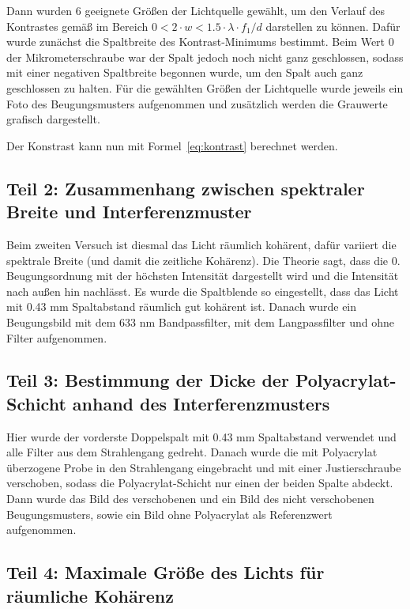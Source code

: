\documentclass{article}
\begin{document}
Dann wurden 6 geeignete Größen der Lichtquelle gewählt, um den Verlauf des Kontrastes gemäß im Bereich $0 < 2\cdot w < 1.5 \cdot \lambda\cdot f_1 / d$ darstellen zu können. Dafür wurde zunächst die Spaltbreite des Kontrast-Minimums bestimmt. Beim Wert 0 der Mikrometerschraube war der Spalt jedoch noch nicht ganz geschlossen, sodass mit einer negativen Spaltbreite begonnen wurde, um den Spalt auch ganz geschlossen zu halten.
Für die gewählten Größen der Lichtquelle wurde jeweils ein Foto des Beugungsmusters aufgenommen und zusätzlich werden die Grauwerte grafisch dargestellt.

Der Konstrast kann nun mit Formel~\ref{eq:kontrast} berechnet werden.


\subsection{Teil 2: Zusammenhang zwischen spektraler Breite und Interferenzmuster}

Beim zweiten Versuch ist diesmal das Licht räumlich kohärent, dafür variiert die spektrale Breite (und damit die zeitliche Kohärenz). Die Theorie sagt, dass die 0. Beugungsordnung mit der höchsten Intensität dargestellt wird und die Intensität nach außen hin nachlässt. Es wurde die Spaltblende so eingestellt, dass das Licht mit 0.43 mm Spaltabstand räumlich gut kohärent ist. Danach wurde ein Beugungsbild mit dem 633 nm Bandpassfilter, mit dem Langpassfilter und ohne Filter aufgenommen. 


\subsection{Teil 3: Bestimmung der Dicke der Polyacrylat-Schicht anhand des Interferenzmusters}

Hier wurde der vorderste Doppelspalt mit 0.43 mm Spaltabstand verwendet und alle Filter aus dem Strahlengang gedreht. Danach wurde die mit Polyacrylat überzogene Probe in den Strahlengang eingebracht und mit einer Justierschraube verschoben, sodass die Polyacrylat-Schicht nur einen der beiden Spalte abdeckt. Dann wurde das Bild des verschobenen und ein Bild des nicht verschobenen Beugungsmusters, sowie ein Bild ohne Polyacrylat als Referenzwert aufgenommen.

\subsection{Teil 4: Maximale Größe des Lichts für räumliche Kohärenz}
\end{document}
